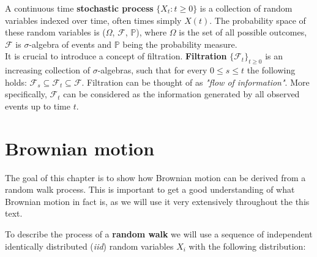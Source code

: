 \documentclass[times, utf8, diplomski]{fer}
\begin{document}
\noindent A continuous time \textbf{stochastic process} $\{X_t: t\ge 0\}$ is a collection of random variables indexed over time, often times simply $X(t)$. The probability space of these random variables is ($\Omega$, $\mathcal{F}$, $\mathbb{P}$), where $\Omega$ is the set of all possible outcomes, $\mathcal{F}$ is $\sigma$-algebra of events and $\mathbb{P}$ being the probability measure.\\
It is crucial to introduce a concept of filtration. \textbf{Filtration} $\{\mathcal{F}_t\}_{t\ge 0}$ is an increasing collection of $\sigma$-algebras, such that for every $0 \le s \le t$ the following holds: $\mathcal{F}_s \subseteq \mathcal{F}_t \subseteq \mathcal{F}$. Filtration can be thought of as \textit{"flow of information"}. More specifically, $\mathcal{F}_t$ can be considered as the information generated by all observed events up to time $t$.

\section{Brownian motion}
The goal of this chapter is to show how Brownian motion can be derived from a random walk process. This is important to get a good understanding of what Brownian motion in fact is, as we will use it very extensively throughout the this text.

\noindent To describe the process of a \textbf{random walk} we will use a sequence of independent identically distributed (\textit{iid}) random variables $X_i$ with the following distribution:
\end{document}
